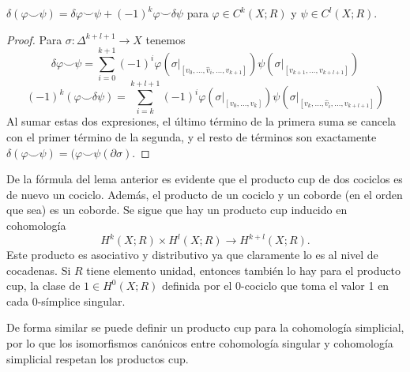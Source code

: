 \documentclass[TA.tex]{subfiles}
\begin{document}
\begin{lemma}
$\delta(\varphi\smile\psi)=\delta\varphi\smile\psi+(-1)^k\varphi\smile\delta\psi$ para $\varphi\in C^k(X;R)$ y $\psi\in C^l(X;R)$. 
\end{lemma}
\begin{proof}
Para $\sigma:\Delta^{k+l+1}\to X$ tenemos
\[
\delta\varphi\smile\psi=\sum_{i=0}^{k+1}(-1)^i\varphi(\sigma|_{[v_0,\dots, \hat{v}_i,\dots, v_{k+1}]})\psi(\sigma|_{[v_{k+1},\dots, v_{k+l+1}]})
\]
\[
(-1)^k(\varphi\smile\delta\psi)=\sum_{i=k}^{k+l+1}(-1)^i\varphi(\sigma|_{[v_0,\dots, v_k]})\psi(\sigma|_{[v_k,\dots, \hat{v}_i,\dots, v_{k+l+1}]})
\]
Al sumar estas dos expresiones, el último término de la primera suma se cancela con el primer término de la segunda, y el resto de términos son exactamente $\delta(\varphi\smile\psi)=(\varphi\smile\psi(\partial\sigma)$. 
\end{proof}
De la fórmula del lema anterior es evidente que el producto cup de dos cociclos es de nuevo un cociclo. Además, el producto de un cociclo y un coborde (en el orden que sea) es un coborde. Se sigue que hay un producto cup inducido en cohomología 
\[
H^k(X;R)\times H^l(X;R)\to H^{k+l}(X;R). 
\]
Este producto es asociativo y distributivo ya que claramente lo es al nivel de cocadenas. Si $R$ tiene elemento unidad, entonces también lo hay para el producto cup, la clase de $1\in H^0(X;R)$ definida por el 0-cociclo que toma el valor 1 en cada 0-símplice singular. 

De forma similar se puede definir un producto cup para la cohomología simplicial, por lo que los isomorfismos canónicos entre cohomología singular y cohomología simplicial respetan los productos cup. 
\end{document}
